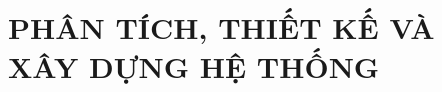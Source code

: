 \chapter{PHÂN TÍCH, THIẾT KẾ VÀ XÂY DỰNG HỆ THỐNG}
\label{chap:chap4-system-analysis-and-design}









